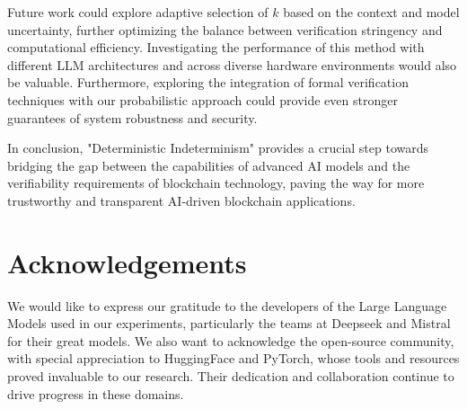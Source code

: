 \documentclass{article}
\begin{document}
Future work could explore adaptive selection of $k$ based on the context and model uncertainty, further optimizing the balance between verification stringency and computational efficiency.  Investigating the performance of this method with different LLM architectures and across diverse hardware environments would also be valuable. Furthermore, exploring the integration of formal verification techniques with our probabilistic approach could provide even stronger guarantees of system robustness and security.

In conclusion, "Deterministic Indeterminism" provides a crucial step towards bridging the gap between the capabilities of advanced AI models and the verifiability requirements of blockchain technology, paving the way for more trustworthy and transparent AI-driven blockchain applications.

\section*{Acknowledgements}
We would like to express our gratitude to the developers of the Large Language Models used in our experiments, particularly the teams at Deepseek and Mistral for their great models. We also want to acknowledge the open-source community, with special appreciation to HuggingFace and PyTorch, whose tools and resources proved invaluable to our research. Their dedication and collaboration continue to drive progress in these domains.

\end{document}

